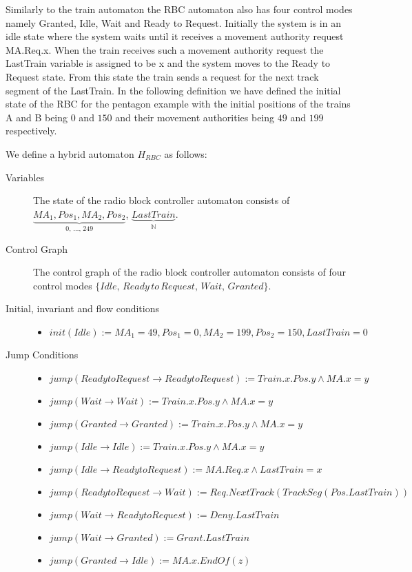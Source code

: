 \medskip
Similarly to the train automaton the RBC automaton also has four control modes namely Granted, Idle, Wait and Ready to Request. Initially the system is in an idle state where the system waits until it receives a movement authority request MA.Req.x. When the train receives such a movement authority request the LastTrain variable is assigned to be x and the system moves to the Ready to Request state.  From this state the train sends a request for the next track segment of the LastTrain. In the following definition we have defined the initial state of the RBC for the pentagon example with the initial positions of the trains A and B being $0$ and $150$ and their movement authorities being $49$ and $199$ respectively.
\medskip

\begin{mydef}

We define a hybrid automaton $H_{RBC}$ as follows:
\begin{description}
\item[Variables] The state of the radio block controller automaton consists of $\underbrace{MA_1, Pos_1, MA_2, Pos_2}_\text{0, \ldots , 249}$, \newline $\underbrace{LastTrain}_{\mathbb{N}}$.

\item[Control Graph] The control graph of the radio block controller automaton consists of four control modes $\{Idle, \, Ready \, to \, Request, \, Wait, \, Granted \}$.

\item[Initial, invariant and flow conditions] \hspace*{0mm}
	\begin{itemize}
	\item $init(Idle) :=   MA_1 = 49, Pos_1 = 0, MA_2 = 199, Pos_2 = 150, LastTrain = 0 $

	\end{itemize}

\item[Jump Conditions] \hspace*{0mm}

	\begin{itemize}
	\item $jump(Ready to Request \to Ready to Request) := Train.x.Pos.y \wedge MA.x = y$
	\item $jump(Wait \to Wait) := Train.x.Pos.y \wedge MA.x = y$
	\item $jump(Granted \to Granted) := Train.x.Pos.y \wedge MA.x = y$
	\item $jump(Idle \to Idle) := Train.x.Pos.y \wedge MA.x = y$
	\item $jump(Idle \to Ready to Request) := MA.Req.x \wedge LastTrain = x$
	\item $jump(Ready to Request \to Wait) := Req.NextTrack(TrackSeg(Pos.LastTrain))$
	\item $jump(Wait \to Ready to Request) := Deny.LastTrain$
	\item $jump(Wait \to Granted) := Grant.LastTrain$
	\item $jump(Granted \to Idle) := MA.x.EndOf(z)$




\end{itemize}
\end{description}
\end{mydef}
